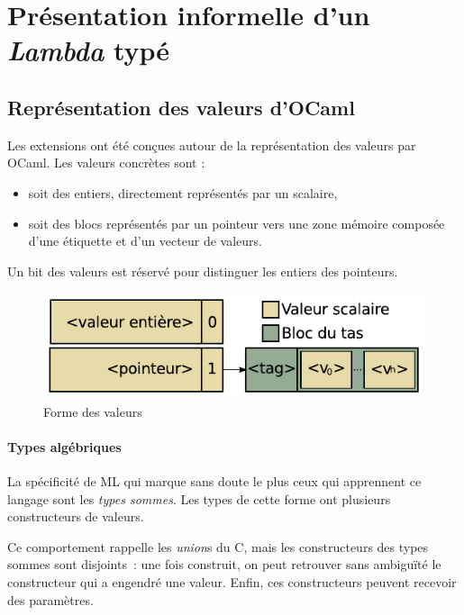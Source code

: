 \section{Présentation informelle d'un \emph{Lambda} typé}


\subsection{Représentation des valeurs d'OCaml}

Les extensions ont été conçues autour de la représentation des valeurs par
OCaml. Les valeurs concrètes sont :
\begin{itemize}
  \item soit des entiers, directement représentés par un scalaire,
  \item soit des blocs représentés par un pointeur vers une
zone mémoire composée d'une étiquette et d'un vecteur de valeurs.
\end{itemize}
Un bit des valeurs est réservé pour distinguer les entiers des pointeurs.

\begin{figure}
\centering
\includegraphics{media/ocaml_value}
\caption{Forme des valeurs}
\end{figure}

\paragraph{Types algébriques}

La spécificité de ML qui marque sans doute le plus ceux qui apprennent ce langage
sont les \emph{types sommes}. Les types de cette forme ont plusieurs
constructeurs de valeurs.

Ce comportement rappelle les \emph{union}s du C, mais les constructeurs des
types sommes sont disjoints : une fois construit, on peut retrouver sans
ambiguïté le constructeur qui a engendré une valeur. Enfin, ces constructeurs
peuvent recevoir des paramètres. 

